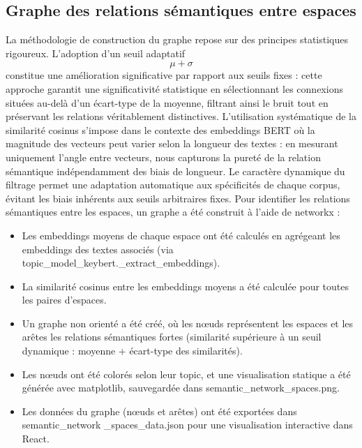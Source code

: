 \documentclass[mstat,12pt]{unswthesis}
\begin{document}
\bigskip

\subsection{Graphe des relations sémantiques entre espaces}

La méthodologie de construction du graphe repose sur des principes statistiques rigoureux. L'adoption d'un seuil adaptatif \[\mu + \sigma\] constitue une amélioration significative par rapport aux seuils fixes : cette approche garantit une significativité statistique en sélectionnant les connexions situées au-delà d'un écart-type de la moyenne, filtrant ainsi le bruit tout en préservant les relations véritablement distinctives. L'utilisation systématique de la similarité cosinus s'impose dans le contexte des embeddings BERT où la magnitude des vecteurs peut varier selon la longueur des textes : en mesurant uniquement l'angle entre vecteurs, nous capturons la pureté de la relation sémantique indépendamment des biais de longueur. Le caractère dynamique du filtrage permet une adaptation automatique aux spécificités de chaque corpus, évitant les biais inhérents aux seuils arbitraires fixes.
Pour identifier les relations sémantiques entre les espaces, un graphe a été construit à l'aide de networkx :

\begin{itemize}
    \item 

    Les embeddings moyens de chaque espace ont été calculés en agrégeant les embeddings des textes associés (via topic\_model\_keybert.\_extract\_embeddings).

    \item 

    La similarité cosinus entre les embeddings moyens a été calculée pour toutes les paires d'espaces.

    \item 

    Un graphe non orienté a été créé, où les nœuds représentent les espaces et les arêtes les relations sémantiques fortes (similarité supérieure à un seuil dynamique : moyenne + écart-type des similarités).

    \item 

    Les nœuds ont été colorés selon leur topic, et une visualisation statique a été générée avec matplotlib, sauvegardée dans semantic\_network\_spaces.png.

    \item 

    Les données du graphe (nœuds et arêtes) ont été exportées dans semantic\_network
    \_spaces\_data.json pour une visualisation interactive dans React.
\end{itemize}
\end{document}
